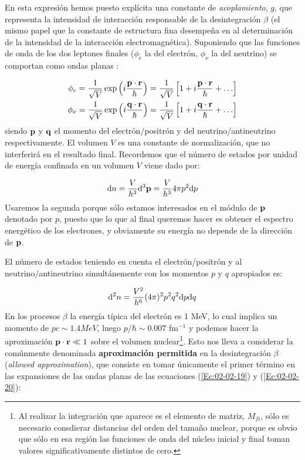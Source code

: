 En esta expresión hemos puesto explícita una constante de \textit{acoplamiento}, $g$, que representa la intensidad de interacción responsable de la desintegración $\beta$ (el mismo papel que la constante de estructura fina desempeña en al determinación de la intensidad de la interacción electromagnética). Suponiendo que las funciones de onda de los dos leptones finales ($\phi_e$ la del electrón, $\phi_\nu$ la del neutrino) se comportan como ondas planas :

\begin{eqnarray}
	\phi_e = \frac{1}{\sqrt{V}} \exp \left( i \frac{\mathbf{p} \cdot \mathbf{r}}{\hbar} \right) = \frac{1}{\sqrt{V}} \left[ 1+i\frac{\mathbf{p} \cdot \mathbf{r}}{\hbar}+ \ldots \right] \label{Ec:02-02-19}  \\
	\phi_\nu = \frac{1}{\sqrt{V}} \exp  \left( i \frac{\mathbf{q} \cdot \mathbf{r}}{\hbar} \right) = \frac{1}{\sqrt{V}} \left[ 1+i\frac{\mathbf{q} \cdot \mathbf{r}}{\hbar}+ \ldots \right] \label{Ec:02-02-20}
\end{eqnarray}
siendo $\mathbf{p}$ y $\mathbf{q}$ el momento del electrón/positrón y del neutrino/antineutrino respectivamente. El volumen $V$ es una constante de normalización, que no interferirá en el resultado final. Recordemos que el número de estados por unidad de energía confinada en un volumen $V$ viene dado por:

\begin{eqnarray}
	\mathrm{d} n = \frac{V}{h^3} \mathrm{d}^3 \mathbf{p} = \frac{V}{h^3} 4 \pi p^2 \mathrm{d} p
\end{eqnarray}
Usaremos la segunda porque sólo estamos interesados en el módulo de $\mathbf{p}$ denotado por $p$, puesto que lo que al final queremos hacer es obtener el espectro energético de los electrones, y obviamente su energía no depende de la dirección de $\mathbf{p}$. 

El número de estados teniendo en cuenta el electrón/positrón y al neutrino/antineutrino simultánemente con los momentos $p$ y $q$ apropiados es:

\begin{eqnarray}
	\mathrm{d}^2 n = \frac{V^2}{h^6} (4\pi)^2 p^2 q^2 \mathrm{d} p \mathrm{d} q
\end{eqnarray}
En los procesos $\beta$ la energía típica del electrón es 1 MeV, lo cual implica un momento de $pc\sim1.4 MeV$, luego $p/\hbar \sim 0.007$ fm$^{-1}$ y podemos hacer la aproximación $\mathbf{p}\cdot\mathbf{r}\ll 1$ sobre el volumen nuclear\footnote{Al realizar la integración que aparece es el elemento de matriz, $M_{fi}$, sólo es necesario consdierar distancias del orden del tamaño nuclear, porque es obvio que sólo en esa región las funciones de onda del núcleo inicial y final toman valores significativamente distintos de cero.}. Esto nos lleva a considerar la comúnmente denominada \textbf{aproximación permitida} en la desintegración $\beta$ (\textit{allowed approximation}), que consiste en tomar únicamente el primer término en las expansiones de las ondas planas de las ecuaciones (\ref{Ec:02-02-19}) y (\ref{Ec:02-02-20}):

